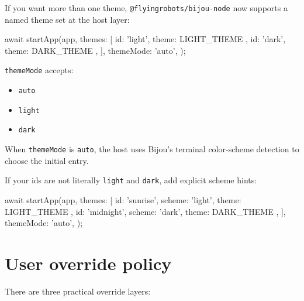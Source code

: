 If you want more than one theme, \texttt{@\allowbreak{}f\allowbreak{}l\allowbreak{}y\allowbreak{}i\allowbreak{}n\allowbreak{}g\allowbreak{}r\allowbreak{}o\allowbreak{}b\allowbreak{}o\allowbreak{}t\allowbreak{}s\allowbreak{}/\allowbreak{}b\allowbreak{}i\allowbreak{}j\allowbreak{}o\allowbreak{}u\allowbreak{}-\allowbreak{}n\allowbreak{}o\allowbreak{}d\allowbreak{}e} now supports a named theme set at the host layer:

\begin{CodeBlock}
await startApp(app, {
  themes: [
    { id: 'light', theme: LIGHT_THEME },
    { id: 'dark', theme: DARK_THEME },
  ],
  themeMode: 'auto',
});
\end{CodeBlock}

\texttt{t\allowbreak{}h\allowbreak{}e\allowbreak{}m\allowbreak{}e\allowbreak{}M\allowbreak{}o\allowbreak{}d\allowbreak{}e} accepts:

\begin{itemize}
\tightlist
\item
  \texttt{a\allowbreak{}u\allowbreak{}t\allowbreak{}o}
\item
  \texttt{l\allowbreak{}i\allowbreak{}g\allowbreak{}h\allowbreak{}t}
\item
  \texttt{d\allowbreak{}a\allowbreak{}r\allowbreak{}k}
\end{itemize}

When \texttt{t\allowbreak{}h\allowbreak{}e\allowbreak{}m\allowbreak{}e\allowbreak{}M\allowbreak{}o\allowbreak{}d\allowbreak{}e} is \texttt{a\allowbreak{}u\allowbreak{}t\allowbreak{}o}, the host uses Bijou's terminal color-scheme detection to choose the initial entry.

If your ids are not literally \texttt{l\allowbreak{}i\allowbreak{}g\allowbreak{}h\allowbreak{}t} and \texttt{d\allowbreak{}a\allowbreak{}r\allowbreak{}k}, add explicit scheme hints:

\begin{CodeBlock}
await startApp(app, {
  themes: [
    { id: 'sunrise', scheme: 'light', theme: LIGHT_THEME },
    { id: 'midnight', scheme: 'dark', theme: DARK_THEME },
  ],
  themeMode: 'auto',
});
\end{CodeBlock}

\section{User override policy}\label{record-026-user-override-policy}

There are three practical override layers:

